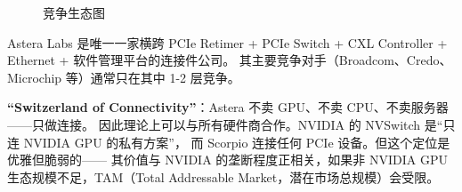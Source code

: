 \begin{figure}[htb]
    \caption{竞争生态图}
    \label{fig:competition-eco}
\end{figure}

Astera Labs 是唯一一家横跨 PCIe Retimer + PCIe Switch + CXL Controller + Ethernet + 软件管理平台的连接件公司。
其主要竞争对手（Broadcom、Credo、Microchip 等）通常只在其中 1-2 层竞争。

\textbf{``Switzerland of Connectivity''}：Astera 不卖 GPU、不卖 CPU、不卖服务器——只做连接。
因此理论上可以与所有硬件商合作。NVIDIA 的 NVSwitch 是``只连 NVIDIA GPU 的私有方案''，
而 Scorpio 连接任何 PCIe 设备。但这个定位是优雅但脆弱的——
其价值与 NVIDIA 的垄断程度正相关，如果非 NVIDIA GPU 生态规模不足，TAM（Total Addressable Market，潜在市场总规模）会受限。
